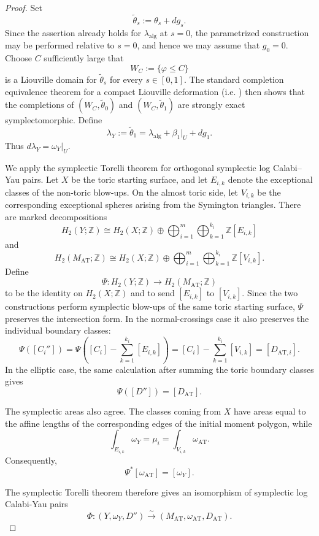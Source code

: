 \documentclass[11pt, reqno]{amsart}
\theoremstyle{definition}
\begin{document}
\begin{proof}
Set
\[
\widetilde{\theta}_s:=\theta_s+dg_s.
\]
Since the assertion already holds for $\lambda_{\mathrm{alg}}$ at
$s=0$, the parametrized construction may be performed relative to
$s=0$, and hence we may assume that $g_0=0$. Choose $C$ sufficiently
large that
\[
W_C:=\{\varphi\leq C\}
\]
is a Liouville domain for $\widetilde{\theta}_s$ for every
$s\in[0,1]$. The standard completion equivalence theorem for a
compact Liouville deformation (i.e. \cite[Proposition 11.8]{CE}) then shows that the completions of
$(W_C,\widetilde{\theta}_0)$ and $(W_C,\widetilde{\theta}_1)$ are
strongly exact symplectomorphic. Define
\[
\lambda_Y:=\widetilde{\theta}_1
=\lambda_{\mathrm{alg}}+\beta_1|_U+dg_1.
\]
Thus $d\lambda_Y=\omega_Y|_U$.






We apply the symplectic Torelli theorem \cite[Theorem 13]{LMN23} for orthogonal symplectic log
Calabi--Yau pairs. Let $X$ be the toric starting surface, and let
$E_{i,k}$ denote the exceptional classes of the non-toric blow-ups.
On the almost toric side, let $V_{i,k}$ be the corresponding
exceptional spheres arising from the Symington triangles. There are
marked decompositions
\[
H_2(Y;\mathbb Z)
\cong
H_2(X;\mathbb Z)
\oplus
\bigoplus_{i=1}^{m}\bigoplus_{k=1}^{k_i}
\mathbb Z[E_{i,k}]
\]
and
\[
H_2(M_{\mathrm{AT}};\mathbb Z)
\cong
H_2(X;\mathbb Z)
\oplus
\bigoplus_{i=1}^{m}\bigoplus_{k=1}^{k_i}
\mathbb Z[V_{i,k}].
\]
Define
\[
\Psi\colon
H_2(Y;\mathbb Z)
\longrightarrow
H_2(M_{\mathrm{AT}};\mathbb Z)
\]
to be the identity on $H_2(X;\mathbb Z)$ and to send
$[E_{i,k}]$ to $[V_{i,k}]$. Since the two constructions perform
symplectic blow-ups of the same toric starting surface, $\Psi$
preserves the intersection form. In the normal-crossings case it also
preserves the individual boundary classes:
\[
\Psi([C_i''])
=
\Psi\left(
[C_i]-\sum_{k=1}^{k_i}[E_{i,k}]
\right)
=
[C_i]-\sum_{k=1}^{k_i}[V_{i,k}]
=
[D_{\mathrm{AT},i}].
\]
In the elliptic case, the same calculation after summing the toric
boundary classes gives
\[
\Psi([D''])=[D_{\mathrm{AT}}].
\]

The symplectic areas also agree. The classes coming from $X$ have
areas equal to the affine lengths of the corresponding edges of the
initial moment polygon, while
\[
\int_{E_{i,k}}\omega_Y
=
\mu_i
=
\int_{V_{i,k}}\omega_{\mathrm{AT}}.
\]
Consequently,
\[
\Psi^*[\omega_{\mathrm{AT}}]=[\omega_Y].
\]


The symplectic Torelli theorem therefore gives an isomorphism of symplectic log Calabi-Yau pairs
\[
\Phi\colon
(Y,\omega_Y,D'')
\xrightarrow{\sim}
(M_{\mathrm{AT}},\omega_{\mathrm{AT}},D_{\mathrm{AT}}).
\]


\end{proof}
\end{document}
